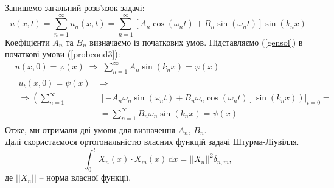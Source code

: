 \documentclass[a4paper, 14pt]{extreport}
\begin{document}
Запишемо загальний розв'язок задачі:
\begin{equation} \label{gensol}
    u(x,t) = \sum^{\infty}_{n=1} u_n(x,t) = \sum^{\infty}_{n=1} \left[A_n\cos(\omega_n t) + B_n\sin(\omega_n t)\right] \sin(k_n x)
\end{equation}
Коефіцієнти $A_n$ та $B_n$ визначаємо із початкових умов. Підставляємо (\ref{gensol}) в початкові умови (\ref{probcond3}):
\begin{equation} \label{sol-init-cond}
    \begin{aligned}
        &u(x,0) = \varphi(x)
        \;\Rightarrow\;
        \sum^{\infty}_{n=1} A_n\sin(k_n x) = \varphi(x)\\
        &\begin{aligned}
            u_t(x,0) = \psi(x)
            \;&\Rightarrow\\
            \Rightarrow \left(\sum^{\infty}_{n=1}\right.&\left.\left. \left[-A_n\omega_n\sin(\omega_n t) + B_n\omega_n\cos(\omega_n t)\right] \sin(k_n x)\right)\right|_{t=0} =\\
            &= \sum^{\infty}_{n=1} B_n\omega_n\sin(k_n x) = \psi(x)
        \end{aligned}
    \end{aligned}
\end{equation}
Отже, ми отримали дві умови для визначення $A_n$, $B_n$.\\
Далі скористаємося ортогональністю власних функцій задачі Штурма-Ліувілля.
\begin{equation} \label{orth}
    \int_0^l X_n(x) \cdot X_m(x) \,\mathrm{d}x = ||X_n||^2\delta_{n,m},
\end{equation}
де $||X_n||$ -- норма власної функції.
\end{document}
